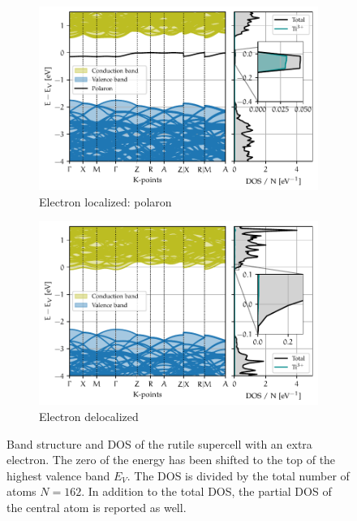 \begin{figure}
    \centering
    \begin{subfigure}[b]{\textwidth}
        \centering
        \includegraphics[width=\textwidth]{figures/polaron}
        \caption{Electron localized: polaron}
        \label{fig:polaron_bands}
    \end{subfigure}
    \hfill
    \begin{subfigure}[b]{\textwidth}
        \centering
        \includegraphics[width=\textwidth]{figures/deloc}
        \caption{Electron delocalized}
        \label{fig:delocalized_bands}
    \end{subfigure}
    \caption[Band structure and DOS of the rutile supercell with an extra electron]{Band structure and DOS of the rutile supercell with an extra electron. The zero of the energy has been shifted to the top of the highest valence band $E_V$. The DOS is divided by the total number of atoms $N = 162$. In addition to the total DOS, the partial DOS of the central atom is reported as well.}
    \label{fig:bands_super_extra}
\end{figure}

